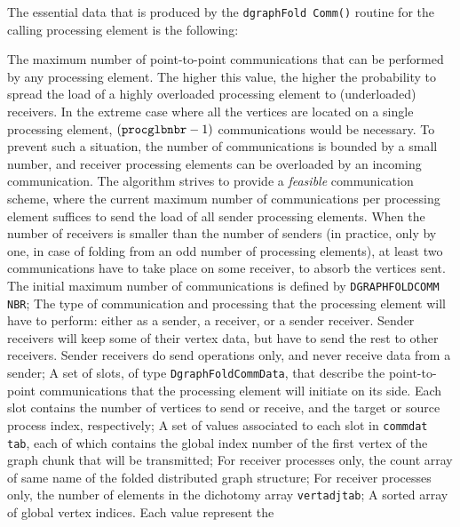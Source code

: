 The essential data that is produced by the \texttt{dgraph\lbt Fold\lbt
Comm()} routine for the calling processing element is the following:
\begin{itemize}
  The maximum number of point-to-point communications that can be
  performed by any processing element. The higher this value, the
  higher the probability to spread the load of a highly overloaded
  processing element to (underloaded) receivers. In the extreme case
  where all the vertices are located on a single processing element,
  $(\mbox{\texttt{procglbnbr}} - 1)$ communications would be
  necessary. To prevent such a situation, the number of communications
  is bounded by a small number, and receiver processing elements can
  be overloaded by an incoming communication. The algorithm strives to
  provide a \textit{feasible} communication scheme, where the current
  maximum number of communications per processing element suffices to
  send the load of all sender processing elements. When the number of
  receivers is smaller than the number of senders (in practice, only
  by one, in case of folding from an odd number of processing
  elements), at least two communications have to take place on some
  receiver, to absorb the vertices sent. The initial maximum number of
  communications is defined by \texttt{DGRAPH\lbt FOLD\lbt COMM\lbt
  NBR};
  The type of communication and processing that the processing element
  will have to perform: either as a sender, a receiver, or a sender
  receiver. Sender receivers will keep some of their vertex data, but
  have to send the rest to other receivers. Sender receivers do send
  operations only, and never receive data from a sender;
  A set of slots, of type \texttt{Dgraph\lbt Fold\lbt Comm\lbt Data},
  that describe the point-to-point communications that the processing
  element will initiate on its side. Each slot contains the number of
  vertices to send or receive, and the target or source process index,
  respectively;
  A set of values associated to each slot in \texttt{comm\lbt dat\lbt
  tab}, each of which contains the global index number of the first
  vertex of the graph chunk that will be transmitted;
  For receiver processes only, the count array of same name of the
  folded distributed graph structure;
  For receiver processes only, the number of elements in the dichotomy
  array \texttt{vert\lbt adj\lbt tab};
  A sorted array of global vertex indices. Each value represent the

\end{itemize}
